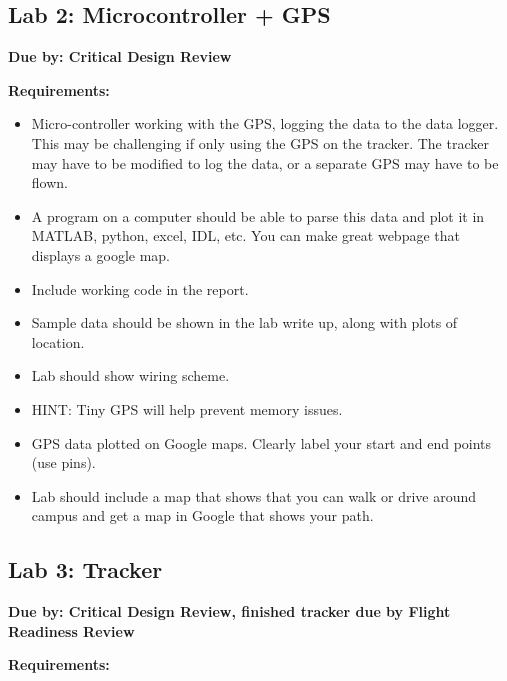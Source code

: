 \documentclass[11pt]{article}
\begin{document}
\subsection{Lab 2:  Microcontroller + GPS}

{\bf Due by: Critical Design Review}

\noindent
{\bf Requirements:}

\begin{itemize}
    \item Micro-controller working with the GPS, logging the data to
      the data logger. This may be challenging if only using the GPS
      on the tracker. The tracker may have to be modified to log the
      data, or a separate GPS may have to be flown.
    \item A program on a computer should be able to parse this data
      and plot it in MATLAB, python, excel, IDL, etc.  You can make
      great webpage that displays a google map.
    \item Include working code in the report.
    \item Sample data should be shown in the lab write up, along with
      plots of location.
    \item Lab should show wiring scheme.  
    \item HINT: Tiny GPS will help prevent memory issues.
    \item GPS data plotted on Google maps. Clearly label your start
      and end points (use pins).
   \item Lab should include a map that shows that you can walk or
     drive around campus and get a map in Google that shows your path.
\end{itemize}

\subsection{Lab 3:  Tracker}

{\bf Due by: Critical Design Review, finished tracker due by Flight
  Readiness Review}

\noindent
{\bf Requirements:}
\end{document}
